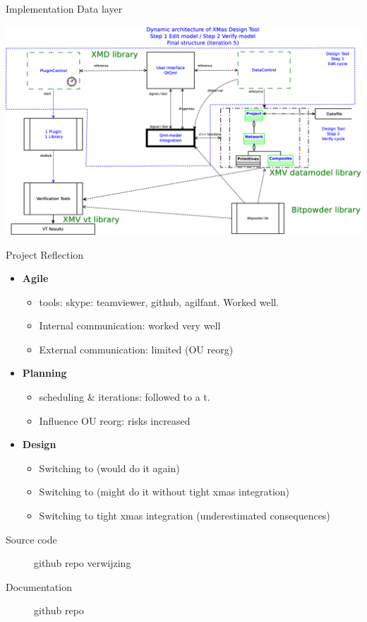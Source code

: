 \documentclass[11pt]{beamer}
\begin{document}
\begin{frame}{Implementation Data layer}

	\includegraphics[width=.95\linewidth]{pictures/1c-architecture-dynamic-2}

\end{frame}

\begin{frame}{Project Reflection}
	\begin{itemize}
		\item {\bf Agile} 
				\begin{itemize}
					\item tools: skype: teamviewer, github, agilfant. Worked well.
					\item Internal communication: worked very well
					\item External communication: limited (OU reorg)
				\end{itemize}
		\item {\bf Planning}
				\begin{itemize}
					\item scheduling \& iterations: followed to a t.
					\item Influence OU reorg: risks increased
				\end{itemize}
		\item {\bf Design} 
			\begin{itemize}
				\item Switching to \qt				 (would do it again)
				\item Switching to \qml				 (might do it without tight xmas integration)
				\item Switching to tight xmas integration (underestimated consequences)
			\end{itemize}
	\end{itemize}
\end{frame}

\begin{frame}
	\begin{description}
		\item[Source code] github repo verwijzing
		\item[Documentation] github repo
	\end{description}
\end{frame}
\end{document}

